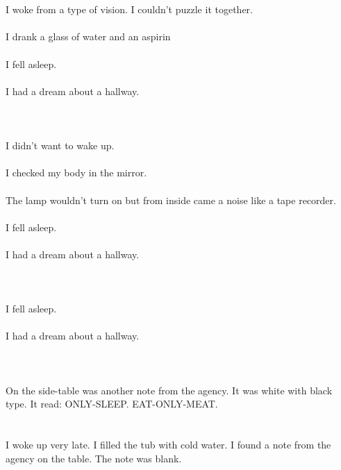 \documentclass{article}
\begin{document}
    \section{}
    I woke from a type of vision. I couldn't puzzle it together.\\\\I drank a glass of water and an aspirin\\\\I fell asleep.\\\\I had a dream about a hallway.\\\\ 
    \newpage
    
    \section{}
    I didn't want to wake up.\\\\I checked my body in the mirror.\\\\The lamp wouldn't turn on but from inside came a noise like a tape recorder.\\\\I fell asleep.\\\\I had a dream about a hallway.\\\\ 
    \newpage
    
    \section{}
    I fell asleep.\\\\I had a dream about a hallway.\\\\ 
    \newpage
    
    \section{}
    On the side-table was another note from the agency. It was white with black type. It read: ONLY-SLEEP. EAT-ONLY-MEAT.  
    \newpage
    
    \section{}
    I woke up very late. I filled the tub with cold water. I found a note from the agency on the table. The note was blank.  
    \newpage
    
\end{document}
